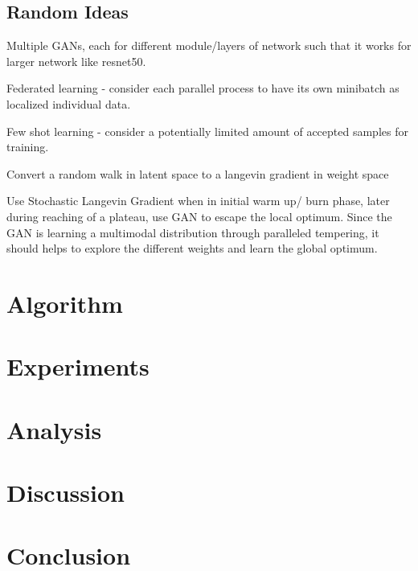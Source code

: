 \documentclass[honours,12pt]{unswthesis}
\numberwithin{equation}{section}
\begin{document}
\section{Random Ideas}
Multiple GANs, each for different module/layers of network such that it works for larger network like resnet50.

Federated learning - consider each parallel process to have its own minibatch as localized individual data.

Few shot learning - consider a potentially limited amount of accepted samples for training. 

Convert a random walk in latent space to a langevin gradient in weight space

Use Stochastic Langevin Gradient when in initial warm up/ burn phase, later during reaching of a plateau, use GAN to escape the local optimum. Since the GAN is learning a multimodal distribution through paralleled tempering, it should helps to explore the different weights and learn the global optimum.

\chapter{Algorithm}\label{meth}




\chapter{Experiments}\label{expe}


\chapter{Analysis}\label{anal}


\chapter{Discussion}\label{disc}

\chapter{Conclusion}\label{conc}




\clearpage


\end{document}
